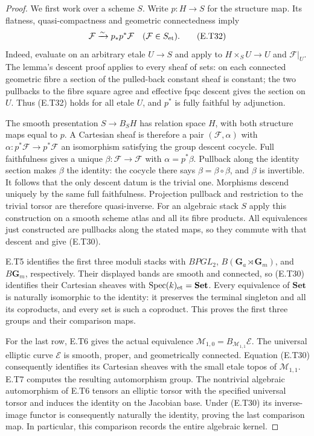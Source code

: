 \begin{proof}
We first work over a scheme $S$.  Write $p:H\to S$ for the
structure map.  Its flatness, quasi-compactness and geometric
connectedness imply
\[
          \mathcal F\xrightarrow{\sim}p_*p^*\mathcal F
                 \quad(\mathcal F\in S_{\rm et}).            \tag{E.T32}
\]
Indeed, evaluate on an arbitrary etale $U\to S$ and apply
\cite[Lemma 59.39.3]{StacksConnectedPullback}
to $H\times_S U\to U$ and $\mathcal F|_U$.
The lemma's descent proof applies to every sheaf of sets:
on each connected geometric fibre a section of the pulled-back
constant sheaf is constant; the two pullbacks to the fibre
square agree and effective fpqc descent gives the section on
$U$.  Thus (E.T32) holds for all etale $U$, and $p^*$ is fully
faithful by adjunction.

The smooth presentation $S\to B_S H$ has relation space $H$,
with both structure maps equal to $p$.  A Cartesian sheaf is
therefore a pair $(\mathcal F,\alpha)$ with
$\alpha:p^*\mathcal F\to p^*\mathcal F$ an isomorphism
satisfying the group descent cocycle.  Full faithfulness gives
a unique $\beta:\mathcal F\to\mathcal F$ with
$\alpha=p^*\beta$.  Pullback along the identity section makes
$\beta$ the identity: the cocycle there says
$\beta=\beta\circ\beta$, and $\beta$ is invertible.
It follows that the only descent datum is the trivial one.
Morphisms descend uniquely by the same full faithfulness.
Projection pullback and restriction to the trivial torsor are
therefore quasi-inverse.  For an algebraic stack $S$ apply
this construction on a smooth scheme atlas and all its fibre
products.  All equivalences just constructed are pullbacks
along the stated maps, so they commute with that descent
and give (E.T30).

E.T5 identifies the first three moduli stacks with
$BPGL_2$, $B(\mathbf G_a\rtimes\mathbf G_m)$, and
$B\mathbf G_m$, respectively.  Their displayed bands are
smooth and connected, so (E.T30) identifies their Cartesian
sheaves with $\operatorname{Spec}(k)_{\rm et}=\mathbf{Set}$.
Every equivalence of $\mathbf{Set}$ is naturally isomorphic
to the identity: it preserves the terminal singleton and all
its coproducts, and every set is such a coproduct.
This proves the first three groups and their comparison maps.

For the last row, E.T6 gives the actual equivalence
$\mathcal M_{1,0}=B_{\mathcal M_{1,1}}\mathcal E$.
The universal elliptic curve $\mathcal E$ is smooth, proper,
and geometrically connected.  Equation (E.T30) consequently
identifies its Cartesian sheaves with the small etale topos
of $\mathcal M_{1,1}$.  E.T7 computes the resulting
automorphism group.  The nontrivial algebraic automorphism
of E.T6 tensors an elliptic torsor with the specified universal
torsor and induces the identity on the Jacobian base.  Under
(E.T30) its inverse-image functor is consequently naturally
the identity, proving the last comparison map.  In particular,
this comparison records the entire algebraic kernel.
\end{proof}
